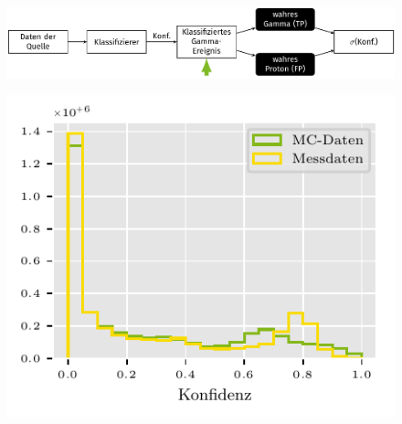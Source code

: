 \documentclass[aspectratio=1610, professionalfonts, 9pt]{beamer}
\begin{document}
\begin{frame}
  \begin{minipage}[t][0.25\textheight][t]{\textwidth}
	\begin{figure}
	  \includegraphics[scale=0.5]{./tikz/Conf/Conf3.pdf}
	\end{figure}
  \end{minipage}
  \begin{minipage}[t][0.75\textheight][t]{\textwidth}
	\begin{figure}
	  \centering
	  \includegraphics[height=0.7\textheight]{Plots/conf.pdf}
	\end{figure}
  \end{minipage}
\end{frame}
\end{document}
